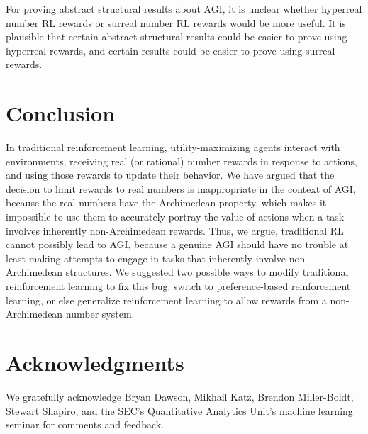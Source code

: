 \documentclass[reqno]{article}
\theoremstyle{definition}
\begin{document}
For proving abstract structural results about AGI, it is unclear
whether hyperreal number RL rewards or surreal number RL rewards would be more
useful. It is plausible that certain abstract structural results could be easier
to prove using hyperreal rewards, and certain results could be easier to
prove using surreal rewards.


\section{Conclusion}
\label{conclusionsection}

In traditional reinforcement learning, utility-maximizing agents interact
with environments, receiving real (or rational) number rewards in response to
actions, and using those rewards to update their behavior. We have argued that
the decision to limit rewards to real numbers is inappropriate in the context
of AGI, because the real numbers have the Archimedean property, which makes it
impossible to use them to accurately portray the value of actions when a task
involves inherently non-Archimedean rewards. Thus, we argue, traditional
RL cannot possibly lead to AGI, because a genuine AGI should have no trouble
at least making attempts to engage in tasks that inherently involve
non-Archimedean structures. We suggested two possible ways
to modify traditional reinforcement learning to fix this bug: switch to
preference-based reinforcement learning, or else generalize reinforcement learning
to allow rewards from a non-Archimedean number system.

\section*{Acknowledgments}

We gratefully acknowledge Bryan Dawson, Mikhail Katz,
Brendon Miller-Boldt, Stewart Shapiro, and the
SEC's Quantitative Analytics Unit's machine learning seminar
for comments and feedback.



\end{document}
